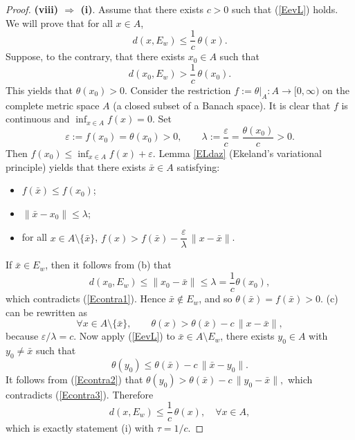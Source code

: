 \documentclass[10pt,a4paper]{amsart}
\begin{document}
\begin{proof}
	\noindent\textbf{(viii) $\Rightarrow$ (i)}.
	 		Assume that  there exists   \(c>0\) such that     (\ref{EevL})   holds.
	 			We will prove that for all \(x\in A\),
	 		\[
	 		d(x,E_w)\le \frac{1}{c}\,\theta(x).
	 		\]
	 		Suppose, to the contrary, that there exists \(x_0\in A\) such that  
	 		\begin{equation}\label{Econtra1}
	 			d(x_0,E_w)>\frac{1}{c}\,\theta(x_0).
	 		\end{equation}
	 	 This yields  that	 \(\theta(x_0)>0\). 
	 		Consider the restriction \(f:=\theta|_A\colon A\to[0,\infty)\) on the complete metric space \(A\) (a closed subset of a Banach space). It is clear that \(f\) is continuous  and \(\inf_{x \in A} f(x)=0\).  
	 		Set
	 		\[
	 		\varepsilon:=f(x_0)=\theta(x_0)>0,\qquad \lambda:=\frac{\varepsilon}{c}=\frac{\theta(x_0)}{c}>0 .
	 		\]
	 		Then \(f(x_0)\le \inf_{x \in A} f(x) +\varepsilon\).    Lemma  \ref{ELdaz} (Ekeland's variational principle)   yields that  there exists \(\bar x\in A\) satisfying:
	 		\begin{itemize}
	 			\item[(a)] \(f(\bar x)\le f(x_0)\);
	 			\item[(b)] \(\|\bar x-x_0\|\le \lambda\);
	 			\item[(c)] for all \(x\in A\setminus\{\bar x\}\), \(f(x) > f(\bar x)-\dfrac{\varepsilon}{\lambda}\,\|x-\bar x\|\).
	 		\end{itemize}
	 		If \(\bar x \in  E_w\), then  it follows from  (b) that
	 		\[
	 		d(x_0,E_w)\le \|x_0-\bar x\|\le \lambda = \frac{1}{c}\theta(x_0),
	 		\]
	 	which contradicts (\ref{Econtra1}). Hence   \(\bar x \notin  E_w\),  and so   \(\theta(\bar x)=f(\bar x)>0\).   (c) can be rewritten as
	 		\begin{equation}\label{Econtra2}
	 			\forall x\in A\setminus\{\bar x\},\qquad \theta(x) > \theta(\bar x) - c\,\|x-\bar x\|,
	 		\end{equation}
	 		because \(\varepsilon/\lambda = c\).
	 			 		Now apply  (\ref{EevL})   to \(\bar x\in A\setminus E_w\),  there exists \(y_0 \in A\) with \(y_0 \neq \bar x\) such that
	 		\begin{equation}\label{Econtra3}
	 			\theta(y_0 ) \le \theta(\bar x) - c\,\|\bar x-y_0\|.
	 		\end{equation}
	 It follows from  (\ref{Econtra2})  that		$\theta(y_0) > \theta(\bar x) - c\,\|y_0-\bar x\|,$
	 		which contradicts (\ref{Econtra3}). 
	 Therefore
	 		\[
	 		d(x,E_w)\le \frac{1}{c}\,\theta(x), \quad \forall x\in A,
	 		\]
	 		which is exactly statement (i) with \(\tau = 1/c\).
	 		

\end{proof}
\end{document}
